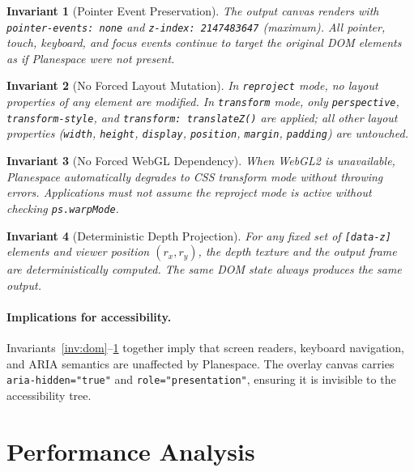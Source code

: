 \documentclass[10pt,twocolumn]{article}
\newtheorem{invariant}{Invariant}
\newcommand{\rx}{r_x}
\newcommand{\ry}{r_y}
\begin{document}
\begin{invariant}[Pointer Event Preservation]
\label{inv:pointer}
The output canvas renders with \texttt{pointer-events: none} and
\texttt{z-index: 2147483647} (maximum). All pointer, touch, keyboard, and
focus events continue to target the original DOM elements as if Planespace
were not present.
\end{invariant}

\begin{invariant}[No Forced Layout Mutation]
\label{inv:layout}
In \texttt{reproject} mode, no layout properties of any element are modified.
In \texttt{transform} mode, only \texttt{perspective}, \texttt{transform-style},
and \texttt{transform: translateZ()} are applied; all other layout properties
(\texttt{width}, \texttt{height}, \texttt{display}, \texttt{position},
\texttt{margin}, \texttt{padding}) are untouched.
\end{invariant}

\begin{invariant}[No Forced WebGL Dependency]
\label{inv:degradation}
When WebGL2 is unavailable, Planespace automatically degrades to CSS
transform mode without throwing errors. Applications must not assume the
reproject mode is active without checking \texttt{ps.warpMode}.
\end{invariant}

\begin{invariant}[Deterministic Depth Projection]
\label{inv:determinism}
For any fixed set of \texttt{[data-z]} elements and viewer position
$(\rx, \ry)$, the depth texture and the output frame are deterministically
computed. The same DOM state always produces the same output.
\end{invariant}

\paragraph{Implications for accessibility.}
Invariants~\ref{inv:dom}--\ref{inv:pointer} together imply that screen
readers, keyboard navigation, and ARIA semantics are unaffected by
Planespace. The overlay canvas carries \texttt{aria-hidden="true"} and
\texttt{role="presentation"}, ensuring it is invisible to the accessibility
tree.

\section{Performance Analysis}
\label{sec:perf}
\end{document}
